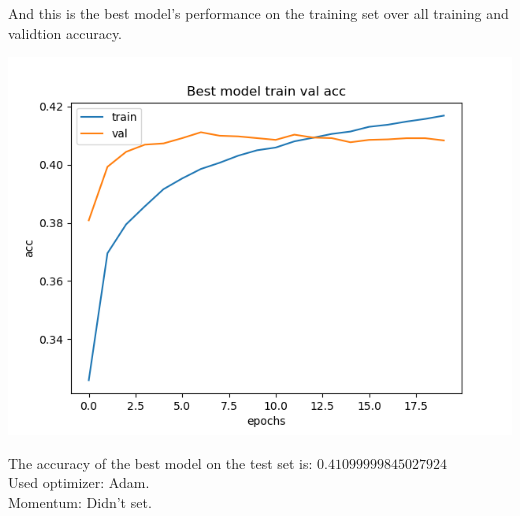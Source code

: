 \documentclass[]{article}
\begin{document}
        And this is the best model's performance on the training set over all training and validtion accuracy. 
        \begin{center}
            \includegraphics[]{a6plots/20-37-33-May-22-2021-Logistic-best-acc.png}
        \end{center}
        The accuracy of the best model on the test set is: $0.41099999845027924$
        \\
        Used optimizer: Adam. 
        \\
        Momentum: Didn't set. 
\end{document}
